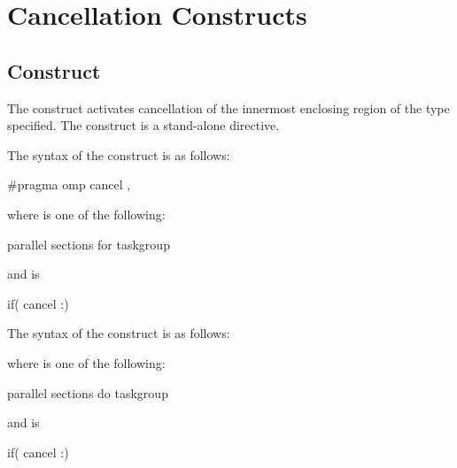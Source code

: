 \section{Cancellation Constructs}
\label{sec:Cancellation Constructs}
\subsection{ Construct}
\label{subsec:cancel Construct}
\summary
The  construct activates cancellation of the innermost enclosing 
region of the type specified. The  construct is a stand-alone directive.

\syntax
\begin{ccppspecific}
The syntax of the  construct is as follows:

\begin{ompcPragma}
#pragma omp cancel \plc{construct-type-clause [ [},\plc{] if-clause] new-line}
\end{ompcPragma}

\begin{samepage}
where  is one of the following:

\begin{indentedcodelist}
parallel
sections
for
taskgroup
\end{indentedcodelist}
\end{samepage}

and  is
\begin{indentedcodelist}
if(\plc{[} cancel :\plc{] scalar-expression})
\end{indentedcodelist}
\end{ccppspecific}

\begin{fortranspecific}
The syntax of the  construct is as follows:



\begin{samepage}
where  is one of the following:
\begin{indentedcodelist}
parallel
sections
do
taskgroup
\end{indentedcodelist}
\end{samepage}

and  is
\begin{indentedcodelist}
if(\plc{[} cancel :\plc{] scalar-logical-expression})
\end{indentedcodelist}
\end{fortranspecific}


